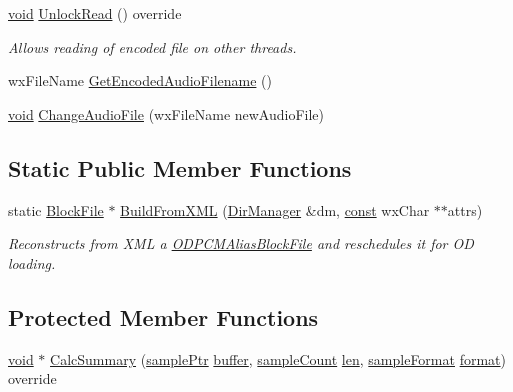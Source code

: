 \begin{DoxyCompactItemize}
\hyperlink{sound_8c_ae35f5844602719cf66324f4de2a658b3}{void} \hyperlink{class_o_d_decode_block_file_a44f54d9088c6e2a64537e0a68c1a2696}{Unlock\+Read} () override
\begin{DoxyCompactList}\small\item\em Allows reading of encoded file on other threads. \end{DoxyCompactList}\item 
wx\+File\+Name \hyperlink{class_o_d_decode_block_file_af5d38af807840cf1097e401edb530e9a}{Get\+Encoded\+Audio\+Filename} ()
\item 
\hyperlink{sound_8c_ae35f5844602719cf66324f4de2a658b3}{void} \hyperlink{class_o_d_decode_block_file_a3f34affc84394313758d3b50b5c99f2f}{Change\+Audio\+File} (wx\+File\+Name new\+Audio\+File)
\end{DoxyCompactItemize}
\subsection*{Static Public Member Functions}
\begin{DoxyCompactItemize}
\item 
static \hyperlink{class_block_file}{Block\+File} $\ast$ \hyperlink{class_o_d_decode_block_file_a040d1bc5007a9b6a04f12a2750bc8e4d}{Build\+From\+X\+ML} (\hyperlink{class_dir_manager}{Dir\+Manager} \&dm, \hyperlink{getopt1_8c_a2c212835823e3c54a8ab6d95c652660e}{const} wx\+Char $\ast$$\ast$attrs)
\begin{DoxyCompactList}\small\item\em Reconstructs from X\+ML a \hyperlink{class_o_d_p_c_m_alias_block_file}{O\+D\+P\+C\+M\+Alias\+Block\+File} and reschedules it for OD loading. \end{DoxyCompactList}\end{DoxyCompactItemize}
\subsection*{Protected Member Functions}
\begin{DoxyCompactItemize}
\item 
\hyperlink{sound_8c_ae35f5844602719cf66324f4de2a658b3}{void} $\ast$ \hyperlink{class_o_d_decode_block_file_aa1b2607de0dd0fe2c456221154dc078d}{Calc\+Summary} (\hyperlink{include_2audacity_2_types_8h_aaafb46d1caf7c79262fec96b577215fe}{sample\+Ptr} \hyperlink{structbuffer}{buffer}, \hyperlink{include_2audacity_2_types_8h_afa427e1f521ea5ec12d054e8bd4d0f71}{sample\+Count} \hyperlink{lib_2expat_8h_af86d325fecfc8f47b61fbf5a5146f582}{len}, \hyperlink{include_2audacity_2_types_8h_a9938d2e2f6adef23e745cd80ef379792}{sample\+Format} \hyperlink{_export_p_c_m_8cpp_a317afff57d87a89158c2b038d37b2b08}{format}) override
\end{DoxyCompactItemize}
